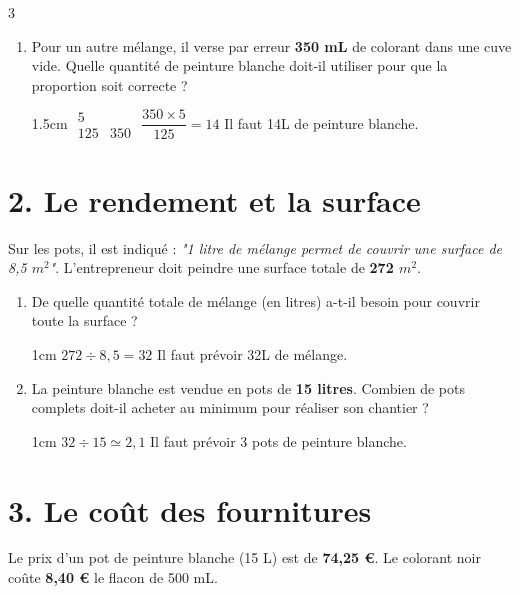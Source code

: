 \documentclass[a4paper]{book}
\begin{document}
{\begin{exerciceNote}{3}
\begin{enumerate}[leftmargin=*]
            \item Pour un autre mélange, il verse par erreur \textbf{350 mL} de colorant dans une cuve vide. Quelle quantité de peinture blanche doit-il utiliser pour que la proportion soit correcte ?

                        
            \begin{ZoneReponse}{1.5cm}
                $\begin{array}{c|c}
                     5 &  \\ \hline
                     125 & 350
                \end{array}$ 
                \quad $\dfrac{350\times5}{125}=14$
                \quad Il faut 14L de peinture blanche.
            \end{ZoneReponse}
        \end{enumerate}
        
        \section*{2. Le rendement et la surface}
        Sur les pots, il est indiqué : \textit{"1 litre de mélange permet de couvrir une surface de 8,5 $m^2$"}. L'entrepreneur doit peindre une surface totale de \textbf{272 $m^2$}.
        
        \begin{enumerate}[resume, leftmargin=*]
            \item De quelle quantité totale de mélange (en litres) a-t-il besoin pour couvrir toute la surface ?
            
            \begin{ZoneReponse}{1cm}   
                $272\div8,5=32$ \quad Il faut prévoir 32L de mélange.
            \end{ZoneReponse}
            
            \item La peinture blanche est vendue en pots de \textbf{15 litres}. Combien de pots complets doit-il acheter au minimum pour réaliser son chantier ?

            \begin{ZoneReponse}{1cm}  
                $32\div15\simeq2,1$ \quad Il faut prévoir 3 pots de peinture blanche.
            \end{ZoneReponse}
        \end{enumerate}
        
        \section*{3. Le coût des fournitures}
        Le prix d'un pot de peinture blanche (15 L) est de \textbf{74,25 \euro}. Le colorant noir coûte \textbf{8,40 \euro} le flacon de 500 mL.
        

\end{exerciceNote}}
\end{document}
